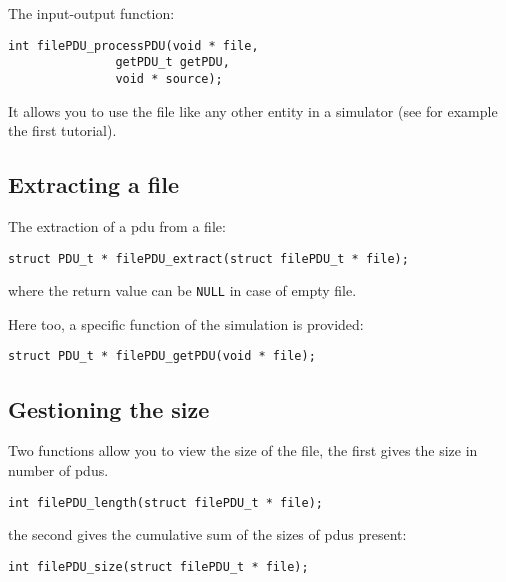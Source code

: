    The input-output function: 

\begin{verbatim}
int filePDU_processPDU(void * file,
		       getPDU_t getPDU,
		       void * source);
\end{verbatim}

   It allows you to use the file like any other entity
in a simulator (see for example the first tutorial).

%
\subsection{Extracting a file}

   The extraction of a {\sc pdu} from a file:

\begin{verbatim}
struct PDU_t * filePDU_extract(struct filePDU_t * file);
\end{verbatim}

   where the return value can be {\tt NULL} in case of empty file.

   Here too, a specific function of the simulation is provided:

\begin{verbatim}
struct PDU_t * filePDU_getPDU(void * file);
\end{verbatim}

%
\subsection{Gestioning the size}

   Two functions allow you to view the size of the file, the
first gives the size in number of {\sc pdu}s.

\begin{verbatim}
int filePDU_length(struct filePDU_t * file);
\end{verbatim}

   the second gives the cumulative sum of the sizes of {\sc pdu}s
present:

\begin{verbatim}
int filePDU_size(struct filePDU_t * file);
\end{verbatim}

